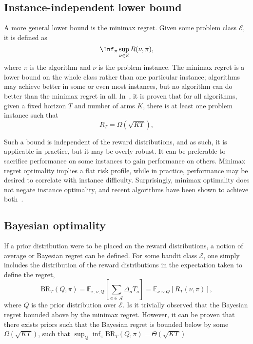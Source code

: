 \subsection{Instance-independent lower bound}
A more general lower bound is the minimax regret.
Given some problem class $\mathcal{E}$, it is defined as
\begin{equation}
    \Inf_{\pi} \sup_{\nu \in \mathcal{E}} R(\nu, \pi),
\end{equation}
where $\pi$ is the algorithm and $\nu$ is the problem instance.
The minimax regret is a lower bound on the whole class rather than one particular instance; algorithms may achieve better in some or even most instances, but no algorithm can do better than the minimax regret in all.
In~\autocite{auer2002a}, it is proven that for all algorithms, given a fixed horizon $T$ and number of arms $K$, there is at least one problem instance such that
\begin{equation}
    R_T = \Omega(\sqrt{KT}),
\end{equation}

Such a bound is independent of the reward distributions, and as such, it is applicable in practice, but it may be overly robust.
It can be preferable to sacrifice performance on some instances to gain performance on others.
Minimax regret optimality implies a flat risk profile, while in practice, performance may be desired to correlate with instance difficulty.
Surprisingly, minimax optimality does not negate instance optimality, and recent algorithms have been shown to achieve both~\autocite{menard2017, jin2020}.


\subsection{Bayesian optimality}
If a prior distribution were to be placed on the reward distributions, a notion of average or Bayesian regret can be defined.
For some bandit class $\mathcal{E}$, one simply includes the distribution of the reward distributions in the expectation taken to define the regret,
\begin{equation}
    \text{BR}_T(Q, \pi)
    = \mathbb{E}_{\pi, \nu, Q} \left[ \sum_{a \in \mathcal{A}} \Delta_a T_a \right]
    = \mathbb{E}_{\nu \sim Q} \left[R_T(\nu, \pi) \right],
\end{equation}
where $Q$ is the prior distribution over $\mathcal{E}$.
Is it trivially observed that the Bayesian regret bounded above by the minimax regret.
However, it can be proven that there exists priors such that the Bayesian regret is bounded below by some $\Omega(\sqrt{KT})$, such that $\sup_{Q} \inf_{\pi} \text{BR}_T(Q, \pi) = \Theta(\sqrt{KT})$~\autocite{lattimore2020}


